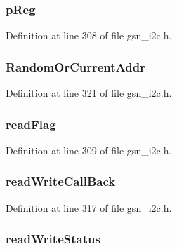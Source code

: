 \hypertarget{a00098_a733fb7afbc3bd37a546de0e37c12f150}{
\subsubsection[{pReg}]{ {\bf pReg}}}
\label{a00098_a733fb7afbc3bd37a546de0e37c12f150}


Definition at line 308 of file gsn\_\-i2c.h.

\hypertarget{a00098_aec66efdce042263a8ec3b44b5bea07c7}{
\subsubsection[{RandomOrCurrentAddr}]{ {\bf RandomOrCurrentAddr}}}
\label{a00098_aec66efdce042263a8ec3b44b5bea07c7}


Definition at line 321 of file gsn\_\-i2c.h.

\hypertarget{a00098_acaa70240adc835acc872ba55e3bf494d}{
\subsubsection[{readFlag}]{ {\bf readFlag}}}
\label{a00098_acaa70240adc835acc872ba55e3bf494d}


Definition at line 309 of file gsn\_\-i2c.h.

\hypertarget{a00098_a864e2e8a49d07675db4d75a711b96c24}{
\subsubsection[{readWriteCallBack}]{ {\bf readWriteCallBack}}}
\label{a00098_a864e2e8a49d07675db4d75a711b96c24}


Definition at line 317 of file gsn\_\-i2c.h.

\hypertarget{a00098_ae96954b586843e04b76147a5b69e0d61}{
\subsubsection[{readWriteStatus}]{ {\bf readWriteStatus}}}
\label{a00098_ae96954b586843e04b76147a5b69e0d61}


